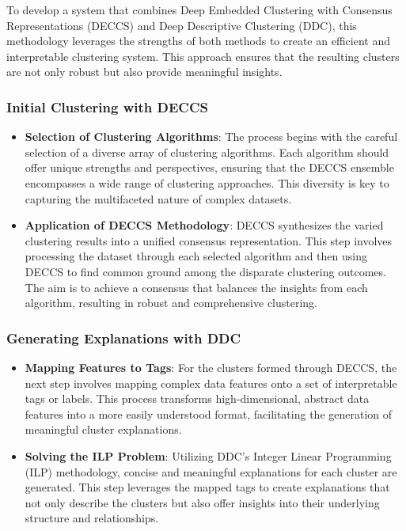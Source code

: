 To develop a system that combines Deep Embedded Clustering with Consensus Representations (DECCS) and Deep Descriptive Clustering (DDC), this methodology leverages the strengths of both methods to create an efficient and interpretable clustering system. This approach ensures that the resulting clusters are not only robust but also provide meaningful insights.

\subsubsection{Initial Clustering with DECCS}
\begin{itemize}
\item \textbf{Selection of Clustering Algorithms}: The process begins with the careful selection of a diverse array of clustering algorithms. Each algorithm should offer unique strengths and perspectives, ensuring that the DECCS ensemble encompasses a wide range of clustering approaches. This diversity is key to capturing the multifaceted nature of complex datasets.

\item \textbf{Application of DECCS Methodology}: DECCS synthesizes the varied clustering results into a unified consensus representation. This step involves processing the dataset through each selected algorithm and then using DECCS to find common ground among the disparate clustering outcomes. The aim is to achieve a consensus that balances the insights from each algorithm, resulting in robust and comprehensive clustering.
\end{itemize}


\subsubsection{Generating Explanations with DDC}
\begin{itemize}
\item \textbf{Mapping Features to Tags}: For the clusters formed through DECCS, the next step involves mapping complex data features onto a set of interpretable tags or labels. This process transforms high-dimensional, abstract data features into a more easily understood format, facilitating the generation of meaningful cluster explanations.

\item \textbf{Solving the ILP Problem}: Utilizing DDC’s Integer Linear Programming (ILP) methodology, concise and meaningful explanations for each cluster are generated. This step leverages the mapped tags to create explanations that not only describe the clusters but also offer insights into their underlying structure and relationships.
\end{itemize}

